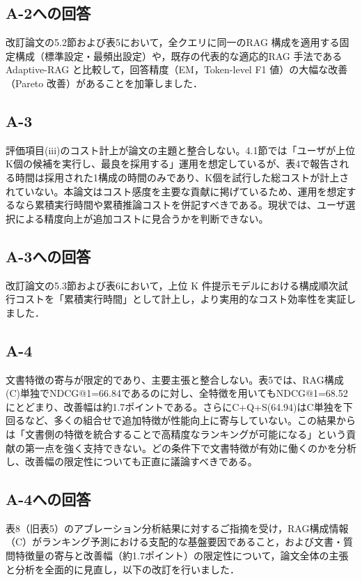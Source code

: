 \documentclass{jsarticle}
\begin{document}
\subsection*{A-2への回答}
改訂論文の5.2節および表5において，全クエリに同一のRAG 構成を適用する固定構成（標準設定・最頻出設定）や，既存の代表的な適応的RAG 手法であるAdaptive-RAG と比較して，回答精度（EM，Token-level F1 値）の大幅な改善（Pareto 改善）があることを加筆しました．

\subsection*{A-3}
\begin{screen}
評価項目(iii)のコスト計上が論文の主題と整合しない。4.1節では「ユーザが上位K個の候補を実行し、最良を採用する」運用を想定しているが、表4で報告される時間は採用された1構成の時間のみであり、K個を試行した総コストが計上されていない。本論文はコスト感度を主要な貢献に掲げているため、運用を想定するなら累積実行時間や累積推論コストを併記すべきである。現状では、ユーザ選択による精度向上が追加コストに見合うかを判断できない。
\end{screen}

\subsection*{A-3への回答}
改訂論文の5.3節および表6において，上位 K 件提示モデルにおける構成順次試行コストを「累積実行時間」として計上し，より実用的なコスト効率性を実証しました．

\subsection*{A-4}
\begin{screen}
文書特徴の寄与が限定的であり、主要主張と整合しない。表5では、RAG構成(C)単独でNDCG@1=66.84であるのに対し、全特徴を用いてもNDCG@1=68.52にとどまり、改善幅は約1.7ポイントである。さらにC+Q+S(64.94)はC単独を下回るなど、多くの組合せで追加特徴が性能向上に寄与していない。この結果からは「文書側の特徴を統合することで高精度なランキングが可能になる」という貢献の第一点を強く支持できない。どの条件下で文書特徴が有効に働くのかを分析し、改善幅の限定性についても正直に議論すべきである。
\end{screen}

\subsection*{A-4への回答}
表8（旧表5）のアブレーション分析結果に対するご指摘を受け，RAG構成情報（C）がランキング予測における支配的な基盤要因であること，および文書・質問特徴量の寄与と改善幅（約1.7ポイント）の限定性について，論文全体の主張と分析を全面的に見直し，以下の改訂を行いました．
\end{document}
